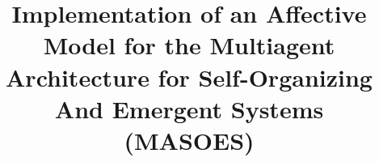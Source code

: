 \documentclass{uclamsc}
\title{Implementation of an Affective Model for the Multiagent Architecture for Self-Organizing And Emergent Systems (MASOES)}
\begin{document}
	
	\resumen{}
	\abstract{}

  \begin{preliminares}
  	\hacercaratula
  	\hacerpresentacion
  	\haceraprobacion
  	
  	
  	\hacerindices
  	\hacerresumen
  	\hacerabstract
  \end{preliminares}

  \begin{contenido}
  	
  	
  	
  	
  	
  	
  	
  \end{contenido}

  \hacerbibliografia

%  	
\end{document}
